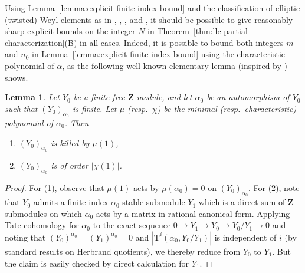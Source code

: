\documentclass[reqno]{amsart}
\numberwithin{equation}{subsection}
\newcommand{\Z}{\mathbf{Z}}
\newcommand{\rT}{\ensuremath{\mathrm{T}}\xspace}
\newtheorem{lemma}[thm]{Lemma}
\theoremstyle{remark}
\numberwithin{equation}{subsection}
\numberwithin{figure}{subsection}
\begin{document}
Using Lemma~\ref{lemma:explicit-finite-index-bound} and the classification of elliptic (twisted) Weyl elements as in \cite[\S3.4]{GP00}, \cite[\S3]{GM97}, \cite[\S\S3 and 4]{GKP00}, and \cite[\S7]{He07}, it should be possible to give reasonably sharp explicit bounds on the integer $N$ in Theorem~\ref{thm:llc-partial-characterization}(B) in all cases. Indeed, it is possible to bound both integers $m$ and $n_0$ in Lemma~\ref{lemma:explicit-finite-index-bound} using the characteristic polynomial of $\alpha$, as the following well-known elementary lemma (inspired by \cite[Lemma 4.1]{Ree11}) shows.

\begin{lemma}\label{lemma:minimal-characteristic-poly-size}
Let $Y_0$ be a finite free $\Z$-module, and let $\alpha_0$ be an automorphism of $Y_0$ such that $(Y_0)_{\alpha_0}$ is finite. Let $\mu$ (resp.\ $\chi$) be the minimal (resp.\ characteristic) polynomial of $\alpha_0$. Then
\begin{enumerate}
    \item $(Y_0)_{\alpha_0}$ is killed by $\mu(1)$,
    \item $(Y_0)_{\alpha_0}$ is of order $|\chi(1)|$.
\end{enumerate}
\end{lemma}

\begin{proof}
For (1), observe that $\mu(1)$ acts by $\mu(\alpha_0) = 0$ on $(Y_0)_{\alpha_0}$. For (2), note that $Y_0$ admits a finite index $\alpha_0$-stable submodule $Y_1$ which is a direct sum of $\Z$-submodules on which $\alpha_0$ acts by a matrix in rational canonical form. Applying Tate cohomology for $\alpha_0$ to the exact sequence $0 \to Y_1 \to Y_0 \to Y_0/Y_1 \to 0$ and noting that $(Y_0)^{\alpha_0} = (Y_1)^{\alpha_0} = 0$ and $|\rT^i(\alpha_0, Y_0/Y_1)|$ is independent of $i$ (by standard results on Herbrand quotients), we thereby reduce from $Y_0$ to $Y_1$. But the claim is easily checked by direct calculation for $Y_1$.
\end{proof}
\end{document}
